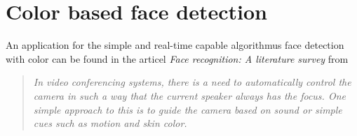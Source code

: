 \documentclass[Bachelorarbeit.tex]{subfiles}
\begin{document}
\section{Color based face detection}
An application for the simple and real-time capable algorithmus face detection with color can be found in the articel  \textit{Face recognition: A literature survey} from \cite{FRLiteratureSurvey}
\begin{quotation}
\textit{In video conferencing systems, there is a need to automatically control the camera in
such a way that the current speaker always has the focus. One simple approach to this
is to guide the camera based on sound or simple cues such as motion and skin color.}
\end{quotation}
\end{document}
